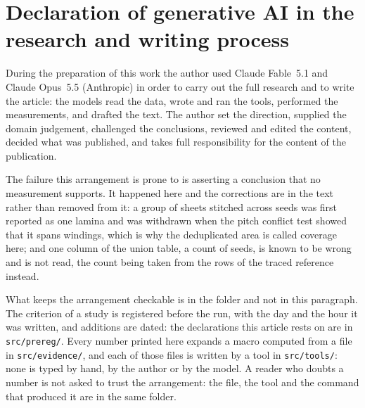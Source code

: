 \section*{Declaration of generative AI in the research and writing process}

During the preparation of this work the author used Claude Fable~5.1 and Claude Opus~5.5 (Anthropic) in order
to carry out the full research and to write the article: the models read the data, wrote and ran the tools,
performed the measurements, and drafted the text. The author set the direction, supplied the domain
judgement, challenged the conclusions, reviewed and edited the content, decided what was
published, and takes full responsibility for the content of the publication.

The failure this arrangement is prone to is asserting a conclusion that no measurement supports.
It happened here and the corrections are in the text rather than removed from it: a group of
sheets stitched across seeds was first reported as one lamina and was withdrawn when the pitch
conflict test showed that it spans windings, which is why the deduplicated area is called coverage
here; and one column of the union table, a count of seeds, is known to be wrong and is not read,
the count being taken from the rows of the traced reference instead.

What keeps the arrangement checkable is in the folder and not in this paragraph. The criterion of
a study is registered before the run, with the day and the hour it was written, and additions are
dated: the declarations this article rests on are in \texttt{src/prereg/}. Every number printed
here expands a macro computed from a file in \texttt{src/evidence/}, and each of those files is
written by a tool in \texttt{src/tools/}: none is typed by hand, by the author or by the model. A
reader who doubts a number is not asked to trust the arrangement: the file, the tool and the
command that produced it are in the same folder.
